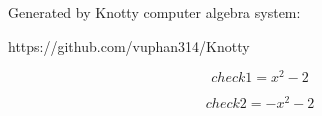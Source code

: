 \documentclass[letterpaper, 10pt]{extarticle}
\begin{document}
Generated by Knotty computer algebra system:

https://github.com/vuphan314/Knotty

\hrulefill

\bigskip

\begin{dmath*}
check1 =
    x^{2} - 2
\end{dmath*}


\begin{dmath*}
check2 =
    - x^{2} - 2
\end{dmath*}
\end{document}
